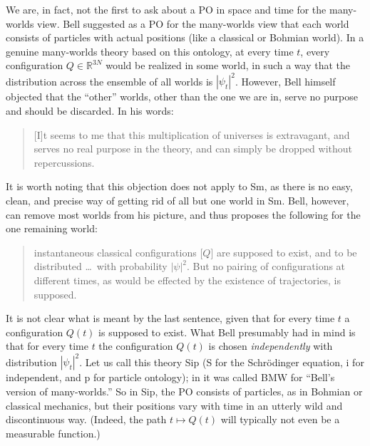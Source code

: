 \documentclass[12pt]{article}
\newcommand{\RRR}{\mathbb{R}}
\begin{document}
We are, in fact, not the first to ask about a PO in space and time for the many-worlds view. Bell \cite{BellMW} suggested as a PO for the many-worlds view that each world consists of particles with actual positions (like a classical or Bohmian world). In a genuine many-worlds theory based on this ontology,  at every time $t$, every configuration $Q\in\RRR^{3N}$ would be realized in some world, in such a way that the distribution across the ensemble of all worlds is $|\psi_t|^2$. However, Bell himself objected that the ``other'' worlds, other than the one we are in, serve no purpose and should be discarded. In his words:
\begin{quotation}
[I]t seems to me that this multiplication of universes is extravagant, and serves no real purpose in the theory, and can simply be dropped without repercussions.
\end{quotation}
It is worth noting that this objection does not apply to Sm, as there is no easy, clean, and precise way of getting rid of all but one world in Sm. Bell, however, can remove most worlds from his picture, and thus proposes the following for the one remaining world:
\begin{quotation}
instantaneous classical configurations [$Q$] are 
supposed to exist, and to be distributed \ldots\ with probability $|\psi|^2$.
But no pairing of configurations at different times, as would be 
effected by the existence of trajectories, is supposed.
\end{quotation}
It is not clear what is meant by the last sentence, given that for every time $t$ a configuration $Q(t)$ is supposed to exist. What Bell presumably had in mind is that for every time $t$ the configuration $Q(t)$ is chosen \emph{independently} with distribution $|\psi_t|^2$. Let us call this theory Sip (S for the Schr\"odinger equation, i for independent, and p for particle ontology); in \cite{AGTZ06} it was called BMW for ``Bell's version of many-worlds.'' So in Sip, the PO consists of particles, as in Bohmian or classical mechanics, but their positions vary with time in an utterly wild and discontinuous way. (Indeed, the path $t\mapsto Q(t)$ will typically not even be a measurable function.) 
\end{document}
